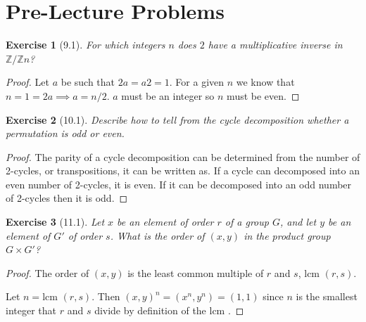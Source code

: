 \documentclass[12pt]{article}
\newtheorem*{exer}{Exercise}
\newcommand{\lcm}{\text{lcm }}
\begin{document}
\section*{Pre-Lecture Problems}

\begin{exer}[9.1]
For which integers $n$ does $2$ have a multiplicative inverse in
$\mathbb Z/ \mathbb Z n$?
\end{exer}

\begin{proof}

    Let $a$ be such that $2a = a2 = 1$. For a given $n$ we know that $n
    = 1 = 2a \implies a = n/2$. $a$ must be an integer so $n$ must be
    even.

\end{proof}


\begin{exer}[10.1]
Describe how to tell from the cycle decomposition whether a permutation
is odd or even.
\end{exer}

\begin{proof}

    The parity of a cycle decomposition can be determined from the
    number of 2-cycles, or transpositions, it can be written as. If a
    cycle can decomposed into an even number of 2-cycles, it is even. If
    it can be decomposed into an odd number of 2-cycles then it is odd.

\end{proof}



\begin{exer}[11.1]
Let $x$ be an element of order $r$ of a group $G$, and let $y$ be an
element of $G'$ of order $s$. What is the order of $(x,y)$ in the
product group $G \times G'$?

\end{exer}

\begin{proof}

     The order of $(x, y)$ is the least common multiple of $r$ and $s$,
     $\lcm(r,s)$.

     Let $n = \lcm(r, s)$. Then $(x,y)^n = (x^n, y^n) = (1, 1)$ since
     $n$ is the smallest integer that $r$ and $s$ divide by definition
     of the $\lcm$. 

\end{proof}
\end{document}
